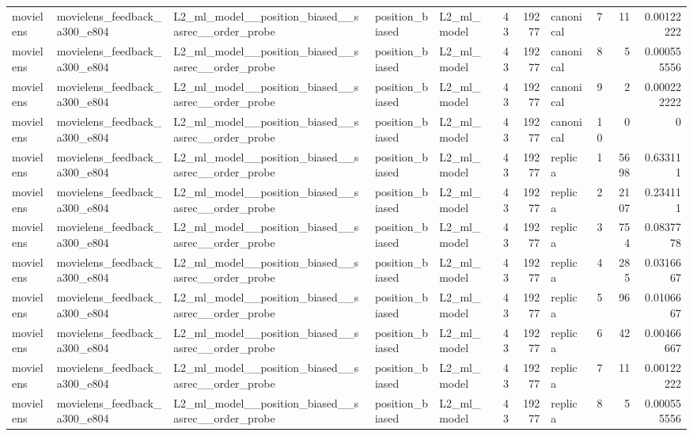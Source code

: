 \begin{table}[htbp!]
\begin{tabular}{lllllrrlrrr}
movielens & movielens\_feedback\_a300\_e804 & L2\_ml\_model\_\_position\_biased\_\_sasrec\_\_order\_probe & position\_biased & L2\_ml\_model & 43 & 19277 & canonical & 7 & 11 & 0.00122222 \\
movielens & movielens\_feedback\_a300\_e804 & L2\_ml\_model\_\_position\_biased\_\_sasrec\_\_order\_probe & position\_biased & L2\_ml\_model & 43 & 19277 & canonical & 8 & 5 & 0.000555556 \\
movielens & movielens\_feedback\_a300\_e804 & L2\_ml\_model\_\_position\_biased\_\_sasrec\_\_order\_probe & position\_biased & L2\_ml\_model & 43 & 19277 & canonical & 9 & 2 & 0.000222222 \\
movielens & movielens\_feedback\_a300\_e804 & L2\_ml\_model\_\_position\_biased\_\_sasrec\_\_order\_probe & position\_biased & L2\_ml\_model & 43 & 19277 & canonical & 10 & 0 & 0 \\
movielens & movielens\_feedback\_a300\_e804 & L2\_ml\_model\_\_position\_biased\_\_sasrec\_\_order\_probe & position\_biased & L2\_ml\_model & 43 & 19277 & replica & 1 & 5698 & 0.633111 \\
movielens & movielens\_feedback\_a300\_e804 & L2\_ml\_model\_\_position\_biased\_\_sasrec\_\_order\_probe & position\_biased & L2\_ml\_model & 43 & 19277 & replica & 2 & 2107 & 0.234111 \\
movielens & movielens\_feedback\_a300\_e804 & L2\_ml\_model\_\_position\_biased\_\_sasrec\_\_order\_probe & position\_biased & L2\_ml\_model & 43 & 19277 & replica & 3 & 754 & 0.0837778 \\
movielens & movielens\_feedback\_a300\_e804 & L2\_ml\_model\_\_position\_biased\_\_sasrec\_\_order\_probe & position\_biased & L2\_ml\_model & 43 & 19277 & replica & 4 & 285 & 0.0316667 \\
movielens & movielens\_feedback\_a300\_e804 & L2\_ml\_model\_\_position\_biased\_\_sasrec\_\_order\_probe & position\_biased & L2\_ml\_model & 43 & 19277 & replica & 5 & 96 & 0.0106667 \\
movielens & movielens\_feedback\_a300\_e804 & L2\_ml\_model\_\_position\_biased\_\_sasrec\_\_order\_probe & position\_biased & L2\_ml\_model & 43 & 19277 & replica & 6 & 42 & 0.00466667 \\
movielens & movielens\_feedback\_a300\_e804 & L2\_ml\_model\_\_position\_biased\_\_sasrec\_\_order\_probe & position\_biased & L2\_ml\_model & 43 & 19277 & replica & 7 & 11 & 0.00122222 \\
movielens & movielens\_feedback\_a300\_e804 & L2\_ml\_model\_\_position\_biased\_\_sasrec\_\_order\_probe & position\_biased & L2\_ml\_model & 43 & 19277 & replica & 8 & 5 & 0.000555556 \\

\end{tabular}
\end{table}
